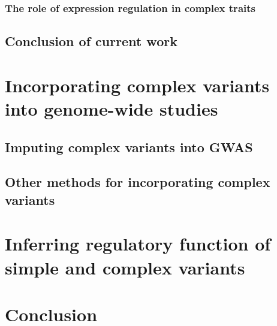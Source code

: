 \subsubsection{The role of expression regulation in complex traits}

\subsection{Conclusion of current work}

\section{Incorporating complex variants into genome-wide studies}

\subsection{Imputing complex variants into GWAS}

\subsection{Other methods for incorporating complex variants}

\section{Inferring regulatory function of simple and complex variants}

\section{Conclusion}
